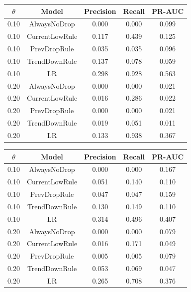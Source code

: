 \documentclass{jot}
\begin{document}
\begin{table}[t]
\setcounter{table}{4}\renewcommand{\thetable}{5a}
\centering
\begin{tabular}{@{}ccccc@{}}
\toprule
$\theta$ & Model & Precision & Recall & PR-AUC \\
\midrule
0.10 & AlwaysNoDrop & 0.000 & 0.000 & 0.099 \\
0.10 & CurrentLowRule & 0.117 & 0.439 & 0.125 \\
0.10 & PrevDropRule & 0.035 & 0.035 & 0.096 \\
0.10 & TrendDownRule & 0.137 & 0.078 & 0.059 \\
0.10 & LR & 0.298 & 0.928 & 0.563 \\
0.20 & AlwaysNoDrop & 0.000 & 0.000 & 0.021 \\
0.20 & CurrentLowRule & 0.016 & 0.286 & 0.022 \\
0.20 & PrevDropRule & 0.000 & 0.000 & 0.021 \\
0.20 & TrendDownRule & 0.019 & 0.051 & 0.011 \\
0.20 & LR & 0.133 & 0.938 & 0.367 \\
\bottomrule
\end{tabular}
\end{table}

\begin{table}[t]
\setcounter{table}{4}\renewcommand{\thetable}{5b}
\centering
\begin{tabular}{@{}ccccc@{}}
\toprule
$\theta$ & Model & Precision & Recall & PR-AUC \\
\midrule
0.10 & AlwaysNoDrop & 0.000 & 0.000 & 0.167 \\
0.10 & CurrentLowRule & 0.051 & 0.140 & 0.110 \\
0.10 & PrevDropRule & 0.047 & 0.047 & 0.159 \\
0.10 & TrendDownRule & 0.130 & 0.149 & 0.110 \\
0.10 & LR & 0.314 & 0.496 & 0.407 \\
0.20 & AlwaysNoDrop & 0.000 & 0.000 & 0.079 \\
0.20 & CurrentLowRule & 0.016 & 0.171 & 0.049 \\
0.20 & PrevDropRule & 0.005 & 0.005 & 0.079 \\
0.20 & TrendDownRule & 0.053 & 0.069 & 0.047 \\
0.20 & LR & 0.265 & 0.708 & 0.376 \\
\bottomrule
\end{tabular}
\end{table}
\end{document}
